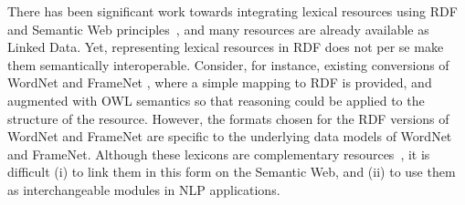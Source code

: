 \noindent 
There has been significant work towards integrating lexical resources using RDF and
Semantic Web principles~\cite{chiarcos2011towards}, and many resources are already
available as Linked Data. %
Yet, representing lexical resources in RDF does not per se make them semantically
interoperable. Consider, for instance, existing conversions of WordNet and FrameNet \cite{van2006conversion,narayanan2003framenet},
where a simple mapping to RDF is provided, and augmented with OWL semantics so that reasoning could be applied to the structure of the resource.
However, the formats chosen for the RDF versions of WordNet and FrameNet are specific to the underlying data models of WordNet and FrameNet.
Although these lexicons are complementary resources~\cite{baker2009wordnet}, %
it is difficult (i) to link them in this form on the Semantic Web, and (ii) to use them as interchangeable modules in NLP applications.


